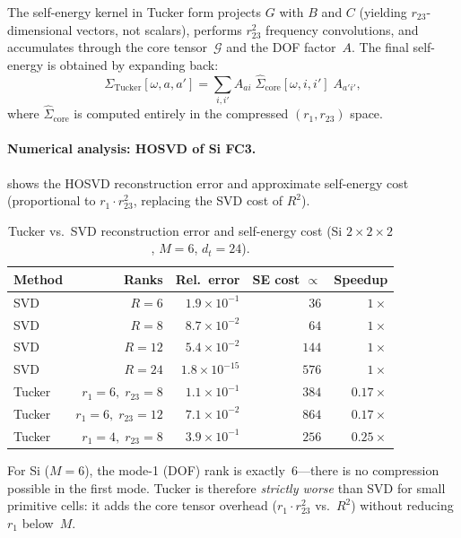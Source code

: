 The self-energy kernel in Tucker form projects $G$ with $B$ and $C$
(yielding $r_{23}$-dimensional vectors, not scalars), performs
$r_{23}^2$ frequency convolutions, and accumulates through the core
tensor~$\mathcal{G}$ and the DOF factor~$A$.  The final
self-energy is obtained by expanding back:
\begin{equation}
  \Sigma_\mathrm{Tucker}[\omega, a, a']
  = \sum_{i,i'} A_{ai}\;
    \hat\Sigma_\mathrm{core}[\omega, i, i']\;
    A_{a'i'},
\end{equation}
where $\hat\Sigma_\mathrm{core}$ is computed entirely in the
compressed $(r_1, r_{23})$ space.

\paragraph{Numerical analysis: HOSVD of Si FC3.}
 shows the HOSVD reconstruction error and
approximate self-energy cost (proportional to $r_1 \cdot r_{23}^2$,
replacing the SVD cost of $R^2$).

\begin{table}[h]
  \centering
  \caption{Tucker vs.\ SVD reconstruction error and self-energy cost
    (Si $2\!\times\!2\!\times\!2$, $M=6$, $d_t=24$).}
  \label{tab:tucker}
  \begin{tabular}{lrrrr}
    \toprule
    Method & Ranks & Rel.\ error & SE cost $\propto$ & Speedup \\
    \midrule
    SVD    & $R=6$             & $1.9 \times 10^{-1}$ & $36$   & $1\times$ \\
    SVD    & $R=8$             & $8.7 \times 10^{-2}$ & $64$   & $1\times$ \\
    SVD    & $R=12$            & $5.4 \times 10^{-2}$ & $144$  & $1\times$ \\
    SVD    & $R=24$            & $1.8 \times 10^{-15}$ & $576$ & $1\times$ \\
    \midrule
    Tucker & $r_1{=}6,\;r_{23}{=}8$  & $1.1 \times 10^{-1}$ & $384$  & $0.17\times$ \\
    Tucker & $r_1{=}6,\;r_{23}{=}12$ & $7.1 \times 10^{-2}$ & $864$  & $0.17\times$ \\
    Tucker & $r_1{=}4,\;r_{23}{=}8$  & $3.9 \times 10^{-1}$ & $256$  & $0.25\times$ \\
    \bottomrule
  \end{tabular}
\end{table}

For Si ($M = 6$), the mode-1 (DOF) rank is exactly~6---there is no
compression possible in the first mode.  Tucker is therefore
\emph{strictly worse} than SVD for small primitive cells: it adds the
core tensor overhead ($r_1 \cdot r_{23}^2$ vs.\ $R^2$) without
reducing $r_1$ below~$M$.

